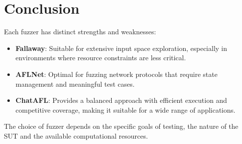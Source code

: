 \chapter{Conclusion} 

Each fuzzer has distinct strengths and weaknesses:
\begin{itemize}
    \item \textbf{Fallaway}: Suitable for extensive input space exploration, especially in environments where resource constraints are less critical.
    \item \textbf{AFLNet}: Optimal for fuzzing network protocols that require state management and meaningful test cases.
    \item \textbf{ChatAFL}: Provides a balanced approach with efficient execution and competitive coverage, making it suitable for a wide range of applications.
\end{itemize}

The choice of fuzzer depends on the specific goals of testing, the nature of the SUT and the available computational resources.